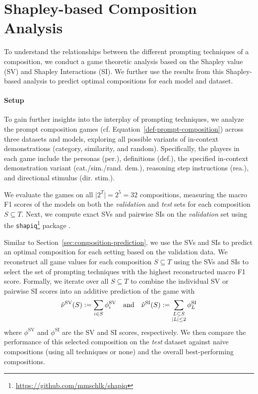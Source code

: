 \section{Shapley-based Composition Analysis}
\label{sec:appendix-sv-composition-analysis}

To understand the relationships between the different prompting techniques of a composition, we conduct a game theoretic analysis based on the Shapley value (SV) and Shapley Interactions (SI).
We further use the results from this Shapley-based analysis to predict optimal compositions for each model and dataset.

\paragraph{Setup}
To gain further insights into the interplay of prompting techniques, we analyze the prompt composition games (cf. Equation~\ref{def-prompt-composition}) across three datasets and models, exploring all possible variants of in-context demonstrations (category, similarity, and random).
Specifically, the players in each game include the personas (per.), definitions (def.), the specified in-context demonstration variant (cat./sim./rand. dem.), reasoning step instructions (rea.), and directional stimulus (dir. stim.).

We evaluate the games on all $\vert 2^T \vert = 2^5 = 32$ compositions, measuring the macro F1 scores of the models on both the \textit{validation} and \textit{test} sets for each composition $S \subseteq T$.
Next, we compute exact SVs and pairwise SIs \cite{Bord.2023,Lundberg.2020} on the \emph{validation} set using the \texttt{shapiq}\footnote{\url{https://github.com/mmschlk/shapiq}} package \cite{muschalik2025}.

Similar to Section~\ref{sec:composition-prediction}, we use the SVs and SIs to predict an optimal composition for each setting based on the validation data.
We reconstruct all game values for each composition $S \subseteq T$ using the SVs and SIs to select the set of prompting techniques with the highest reconstructed macro F1 score.
Formally, we iterate over all $S \subseteq T$ to combine the individual SV or pairwise SI scores into an additive prediction of the game with
\begin{align*}
    \hat{\nu}^\text{SV}(S) := \sum_{i \in S} \phi_i^{\text{SV}}
    \text{\quad and\quad}
    \hat{\nu}^\text{SI}(S) := \sum_{\substack{L \subseteq S\\|L| \leq 2}} \phi_L^{\text{SI}}
\end{align*}
where $\phi^{\text{SV}}$ and $\phi^{\text{SI}}$ are the SV and SI scores, respectively.
We then compare the performance of this selected composition on the \emph{test} dataset against naive compositions (using all techniques or none) and the overall best-performing compositions.

